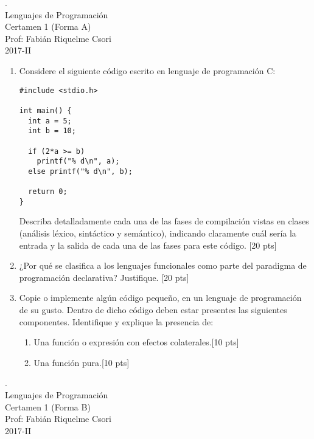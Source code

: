 \documentclass[letter,12pt,oneside]{book}
\theoremstyle{definition}
\begin{document}

\begin{center}
 {\Large
  {\color{white}.}\\[5ex]
  Lenguajes de Programación\\[1ex]
  Certamen 1 (Forma A)}\\[1.2ex]
  Prof: Fabián Riquelme Csori\\
  2017-II
\end{center}

\begin{enumerate}
    \item Considere el siguiente código escrito en lenguaje de programación C:
    
    \begin{lstlisting}[style=CStyle]
#include <stdio.h>

int main() {
  int a = 5;
  int b = 10;
  
  if (2*a >= b)
    printf("% d\n", a);
  else printf("% d\n", b);
  
  return 0;
}
\end{lstlisting}
Describa detalladamente cada una de las fases de compilación vistas en clases (análisis léxico, sintáctico y semántico), indicando claramente cuál sería la entrada y la salida de cada una de las fases para este código. \tabto{80ex}[20 pts]
    
\item ¿Por qué se clasifica a los lenguajes funcionales como parte del paradigma de programación declarativa? Justifique. \tabto{80ex}[20 pts]

\item Copie o implemente algún código pequeño, en un lenguaje de programación de su gusto. Dentro de dicho código deben estar presentes las siguientes componentes. Identifique y explique la presencia de:
    \begin{enumerate}
    \item Una función o expresión con efectos colaterales.\tabto{75ex}[10 pts]
    \item Una función pura.\tabto{75ex}[10 pts]
    \end{enumerate}
\end{enumerate}

\newpage

\begin{center}
 {\Large
  {\color{white}.}\\[5ex]
  Lenguajes de Programación\\[1ex]
  Certamen 1 (Forma B)}\\[1.2ex]
  Prof: Fabián Riquelme Csori\\
  2017-II
\end{center}
\end{document}
